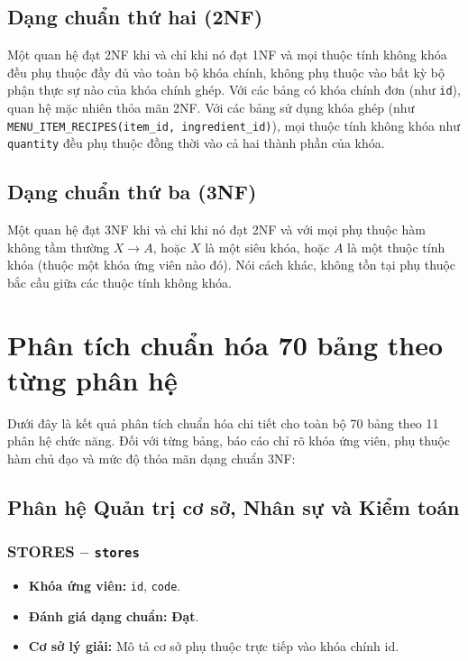 \subsection{Dạng chuẩn thứ hai (2NF)}
Một quan hệ đạt 2NF khi và chỉ khi nó đạt 1NF và mọi thuộc tính không khóa đều phụ thuộc đầy đủ vào toàn bộ khóa chính, không phụ thuộc vào bất kỳ bộ phận thực sự nào của khóa chính ghép. Với các bảng có khóa chính đơn (như \texttt{id}), quan hệ mặc nhiên thỏa mãn 2NF. Với các bảng sử dụng khóa ghép (như \texttt{MENU\_ITEM\_RECIPES(item\_id, ingredient\_id)}), mọi thuộc tính không khóa như \texttt{quantity} đều phụ thuộc đồng thời vào cả hai thành phần của khóa.\par

\subsection{Dạng chuẩn thứ ba (3NF)}
Một quan hệ đạt 3NF khi và chỉ khi nó đạt 2NF và với mọi phụ thuộc hàm không tầm thường $X \rightarrow A$, hoặc $X$ là một siêu khóa, hoặc $A$ là một thuộc tính khóa (thuộc một khóa ứng viên nào đó). Nói cách khác, không tồn tại phụ thuộc bắc cầu giữa các thuộc tính không khóa.\par

\section{Phân tích chuẩn hóa 70 bảng theo từng phân hệ}
Dưới đây là kết quả phân tích chuẩn hóa chi tiết cho toàn bộ 70 bảng theo 11 phân hệ chức năng. Đối với từng bảng, báo cáo chỉ rõ khóa ứng viên, phụ thuộc hàm chủ đạo và mức độ thỏa mãn dạng chuẩn 3NF:\par

\subsection{Phân hệ Quản trị cơ sở, Nhân sự và Kiểm toán}
\subsubsection{STORES -- \texttt{stores}}
\begin{itemize}
  \item \textbf{Khóa ứng viên:} \texttt{id}, \texttt{code}.
  \item \textbf{Đánh giá dạng chuẩn:} \textbf{Đạt}.
  \item \textbf{Cơ sở lý giải:} Mô tả cơ sở phụ thuộc trực tiếp vào khóa chính id.
\end{itemize}

